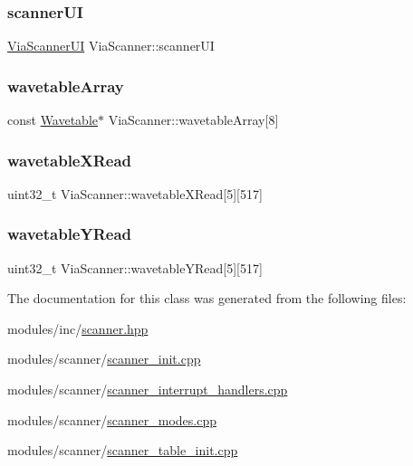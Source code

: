 \subsubsection{\texorpdfstring{scanner\+UI}{scannerUI}}
{\footnotesize\ttfamily \mbox{\hyperlink{class_via_scanner_1_1_via_scanner_u_i}{Via\+Scanner\+UI}} Via\+Scanner\+::scanner\+UI}

\mbox{\label{class_via_scanner_a7128d2220f6ce1278b2f31273631ac99}} 
\subsubsection{\texorpdfstring{wavetable\+Array}{wavetableArray}}
{\footnotesize\ttfamily const \mbox{\hyperlink{struct_wavetable}{Wavetable}}$\ast$ Via\+Scanner\+::wavetable\+Array\mbox{[}8\mbox{]}}

\mbox{\label{class_via_scanner_a35e9caf08ba6556c32db7fc43958115d}} 
\subsubsection{\texorpdfstring{wavetable\+X\+Read}{wavetableXRead}}
{\footnotesize\ttfamily uint32\+\_\+t Via\+Scanner\+::wavetable\+X\+Read\mbox{[}5\mbox{]}\mbox{[}517\mbox{]}}

\mbox{\label{class_via_scanner_ab8d01eb2668d0e34b2f8ebb0002a69de}} 
\subsubsection{\texorpdfstring{wavetable\+Y\+Read}{wavetableYRead}}
{\footnotesize\ttfamily uint32\+\_\+t Via\+Scanner\+::wavetable\+Y\+Read\mbox{[}5\mbox{]}\mbox{[}517\mbox{]}}



The documentation for this class was generated from the following files\+:\begin{DoxyCompactItemize}
\item 
modules/inc/\mbox{\hyperlink{scanner_8hpp}{scanner.\+hpp}}\item 
modules/scanner/\mbox{\hyperlink{scanner__init_8cpp}{scanner\+\_\+init.\+cpp}}\item 
modules/scanner/\mbox{\hyperlink{scanner__interrupt__handlers_8cpp}{scanner\+\_\+interrupt\+\_\+handlers.\+cpp}}\item 
modules/scanner/\mbox{\hyperlink{scanner__modes_8cpp}{scanner\+\_\+modes.\+cpp}}\item 
modules/scanner/\mbox{\hyperlink{scanner__table__init_8cpp}{scanner\+\_\+table\+\_\+init.\+cpp}}\end{DoxyCompactItemize}
